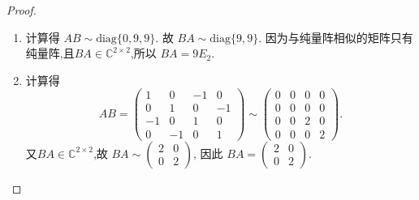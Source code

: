 \documentclass[../../main.tex]{subfiles}
\begin{document}
\begin{proof}
\begin{enumerate}
\item 计算得 \( AB \sim \text{diag}\{0, 9, 9\} \). 故 \( BA \sim \text{diag}\{9, 9\} \). 因为与纯量阵相似的矩阵只有纯量阵,且$BA\in \mathbb{C}^{2\times 2}$,所以 \( BA = 9E_2 \).

\item 计算得
\[
AB = \begin{pmatrix}
1 & 0 & -1 & 0 \\
0 & 1 & 0 & -1 \\
-1 & 0 & 1 & 0 \\
0 & -1 & 0 & 1
\end{pmatrix} \sim \begin{pmatrix}
0 & 0 & 0 & 0 \\
0 & 0 & 0 & 0 \\
0 & 0 & 2 & 0 \\
0 & 0 & 0 & 2
\end{pmatrix}.
\]
又$BA\in \mathbb{C}^{2\times 2}$,故 \( BA \sim \begin{pmatrix} 2 & 0 \\ 0 & 2 \end{pmatrix} \), 因此 \( BA = \begin{pmatrix} 2 & 0 \\ 0 & 2 \end{pmatrix} \).
\end{enumerate}
\end{proof}
\end{document}
